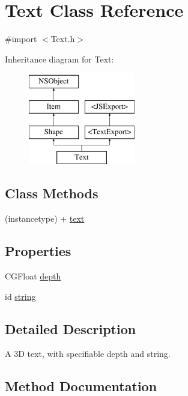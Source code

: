 \hypertarget{interface_text}{}\section{Text Class Reference}
\label{interface_text}


{\ttfamily \#import $<$Text.\+h$>$}

Inheritance diagram for Text\+:\begin{figure}[H]
\begin{center}
\leavevmode
\includegraphics[height=4.000000cm]{interface_text}
\end{center}
\end{figure}
\subsection*{Class Methods}
\begin{DoxyCompactItemize}
\item 
(instancetype) + \hyperlink{interface_text_a868d83b53f2ee4cd2268bf487d6278ff}{text}
\end{DoxyCompactItemize}
\subsection*{Properties}
\begin{DoxyCompactItemize}
\item 
C\+G\+Float \hyperlink{interface_text_a2eb59f3cd515dfb373997bf4b04def84}{depth}
\item 
id \hyperlink{interface_text_afc7e3904e5d70e13a204f9a157a7a564}{string}
\end{DoxyCompactItemize}


\subsection{Detailed Description}
A 3\+D text, with specifiable depth and string. 

\subsection{Method Documentation}
\hypertarget{interface_text_a868d83b53f2ee4cd2268bf487d6278ff}{}
